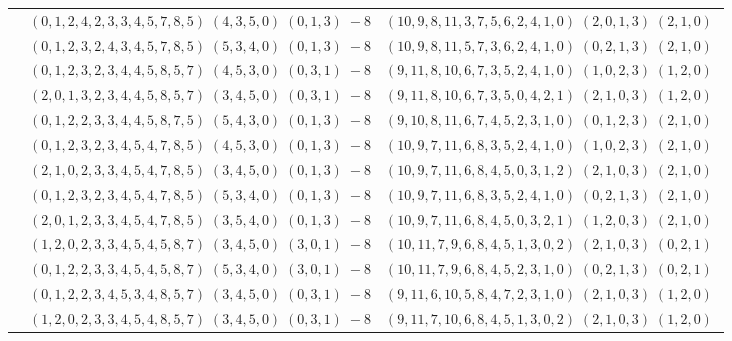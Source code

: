 \documentclass[11pt]{article}
\begin{document}
\begin{longtable}[l]{|c|c|c|}
 \cline{2-3} 
 & $(0 ,1 ,2 ,4 ,2 ,3 ,3 ,4 ,5 ,7 ,8 ,5) \;(4 ,3 ,5 ,0) \;(0 ,1 ,3) \;-8$ & $(10 ,9 ,8 ,11 ,3 ,7 ,5 ,6 ,2 ,4 ,1 ,0) \;(2 ,0 ,1 ,3) \;(2 ,1 ,0) \;$\\ 
 \cline{2-3} 
 & $(0 ,1 ,2 ,3 ,2 ,4 ,3 ,4 ,5 ,7 ,8 ,5) \;(5 ,3 ,4 ,0) \;(0 ,1 ,3) \;-8$ & $(10 ,9 ,8 ,11 ,5 ,7 ,3 ,6 ,2 ,4 ,1 ,0) \;(0 ,2 ,1 ,3) \;(2 ,1 ,0) \;$\\ 
 \cline{2-3} 
 & $(0 ,1 ,2 ,3 ,2 ,3 ,4 ,4 ,5 ,8 ,5 ,7) \;(4 ,5 ,3 ,0) \;(0 ,3 ,1) \;-8$ & $(9 ,11 ,8 ,10 ,6 ,7 ,3 ,5 ,2 ,4 ,1 ,0) \;(1 ,0 ,2 ,3) \;(1 ,2 ,0) \;$\\ 
 \cline{2-3} 
 & $(2 ,0 ,1 ,3 ,2 ,3 ,4 ,4 ,5 ,8 ,5 ,7) \;(3 ,4 ,5 ,0) \;(0 ,3 ,1) \;-8$ & $(9 ,11 ,8 ,10 ,6 ,7 ,3 ,5 ,0 ,4 ,2 ,1) \;(2 ,1 ,0 ,3) \;(1 ,2 ,0) \;$\\ 
 \cline{2-3} 
 & $(0 ,1 ,2 ,2 ,3 ,3 ,4 ,4 ,5 ,8 ,7 ,5) \;(5 ,4 ,3 ,0) \;(0 ,1 ,3) \;-8$ & $(9 ,10 ,8 ,11 ,6 ,7 ,4 ,5 ,2 ,3 ,1 ,0) \;(0 ,1 ,2 ,3) \;(2 ,1 ,0) \;$\\ 
 \cline{2-3} 
 & $(0 ,1 ,2 ,3 ,2 ,3 ,4 ,5 ,4 ,7 ,8 ,5) \;(4 ,5 ,3 ,0) \;(0 ,1 ,3) \;-8$ & $(10 ,9 ,7 ,11 ,6 ,8 ,3 ,5 ,2 ,4 ,1 ,0) \;(1 ,0 ,2 ,3) \;(2 ,1 ,0) \;$\\ 
 \cline{2-3} 
 & $(2 ,1 ,0 ,2 ,3 ,3 ,4 ,5 ,4 ,7 ,8 ,5) \;(3 ,4 ,5 ,0) \;(0 ,1 ,3) \;-8$ & $(10 ,9 ,7 ,11 ,6 ,8 ,4 ,5 ,0 ,3 ,1 ,2) \;(2 ,1 ,0 ,3) \;(2 ,1 ,0) \;$\\ 
 \cline{2-3} 
 & $(0 ,1 ,2 ,3 ,2 ,3 ,4 ,5 ,4 ,7 ,8 ,5) \;(5 ,3 ,4 ,0) \;(0 ,1 ,3) \;-8$ & $(10 ,9 ,7 ,11 ,6 ,8 ,3 ,5 ,2 ,4 ,1 ,0) \;(0 ,2 ,1 ,3) \;(2 ,1 ,0) \;$\\ 
 \cline{2-3} 
 & $(2 ,0 ,1 ,2 ,3 ,3 ,4 ,5 ,4 ,7 ,8 ,5) \;(3 ,5 ,4 ,0) \;(0 ,1 ,3) \;-8$ & $(10 ,9 ,7 ,11 ,6 ,8 ,4 ,5 ,0 ,3 ,2 ,1) \;(1 ,2 ,0 ,3) \;(2 ,1 ,0) \;$\\ 
 \cline{2-3} 
 & $(1 ,2 ,0 ,2 ,3 ,3 ,4 ,5 ,4 ,5 ,8 ,7) \;(3 ,4 ,5 ,0) \;(3 ,0 ,1) \;-8$ & $(10 ,11 ,7 ,9 ,6 ,8 ,4 ,5 ,1 ,3 ,0 ,2) \;(2 ,1 ,0 ,3) \;(0 ,2 ,1) \;$\\ 
 \cline{2-3} 
 & $(0 ,1 ,2 ,2 ,3 ,3 ,4 ,5 ,4 ,5 ,8 ,7) \;(5 ,3 ,4 ,0) \;(3 ,0 ,1) \;-8$ & $(10 ,11 ,7 ,9 ,6 ,8 ,4 ,5 ,2 ,3 ,1 ,0) \;(0 ,2 ,1 ,3) \;(0 ,2 ,1) \;$\\ 
 \cline{2-3} 
 & $(0 ,1 ,2 ,2 ,3 ,4 ,5 ,3 ,4 ,8 ,5 ,7) \;(3 ,4 ,5 ,0) \;(0 ,3 ,1) \;-8$ & $(9 ,11 ,6 ,10 ,5 ,8 ,4 ,7 ,2 ,3 ,1 ,0) \;(2 ,1 ,0 ,3) \;(1 ,2 ,0) \;$\\ 
 \cline{2-3} 
 & $(1 ,2 ,0 ,2 ,3 ,3 ,4 ,5 ,4 ,8 ,5 ,7) \;(3 ,4 ,5 ,0) \;(0 ,3 ,1) \;-8$ & $(9 ,11 ,7 ,10 ,6 ,8 ,4 ,5 ,1 ,3 ,0 ,2) \;(2 ,1 ,0 ,3) \;(1 ,2 ,0) \;$\\ 

\end{longtable}
\end{document}

